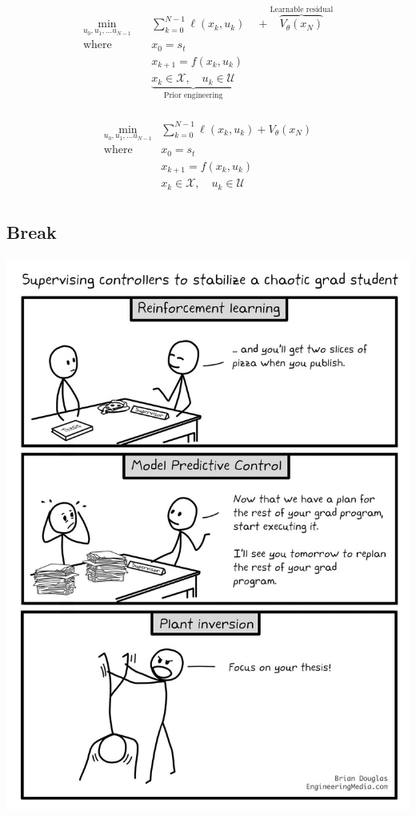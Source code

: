 \documentclass[
  letterpaper,
  DIV=11,
  numbers=noendperiod,
  oneside]{scrartcl}
\begin{document}
\begin{align}
\min_{u_0, u_1, \ldots u_{N - 1}} \quad & \sum_{k=0}^{N-1} \ell(x_k, u_k)\quad + \overbrace{V_{\theta}(x_N)}^{\text{Learnable residual}}\\
\text{where }\quad & x_0 = s_t \\
& x_{k+1} = f(x_k, u_k) \\
& \underbrace{x_k \in \mathcal{X},\quad u_k \in \mathcal{U}}_{\text{Prior engineering}} \\
\end{align}

\begin{align}
\min_{u_0, u_1, \ldots u_{N - 1}} & \sum_{k=0}^{N-1} \ell(x_k, u_k) + V_{\theta}(x_N)\\
\text{where }\quad & x_0 = s_t \\
& x_{k+1} = f(x_k, u_k) \\
& x_k \in \mathcal{X},\quad u_k \in \mathcal{U} \\
\end{align}

\subsection{Break}\label{break-1}

\begin{center}
\includegraphics{figs/Chaotic+Grad+Student+HiRes.jpg}
\end{center}
\end{document}
